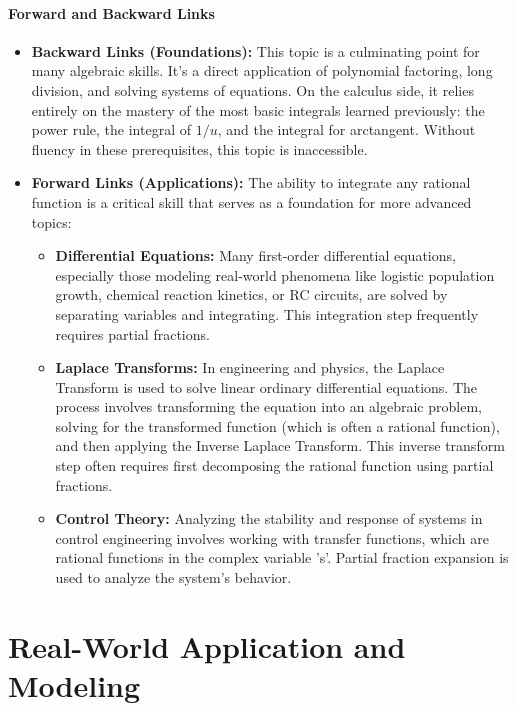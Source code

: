 \documentclass{article}
\begin{document}
\subsection{Forward and Backward Links}
\begin{itemize}
    \item \textbf{Backward Links (Foundations):} This topic is a culminating point for many algebraic skills. It's a direct application of polynomial factoring, long division, and solving systems of equations. On the calculus side, it relies entirely on the mastery of the most basic integrals learned previously: the power rule, the integral of $1/u$, and the integral for arctangent. Without fluency in these prerequisites, this topic is inaccessible.

    \item \textbf{Forward Links (Applications):} The ability to integrate any rational function is a critical skill that serves as a foundation for more advanced topics:
    \begin{itemize}
        \item \textbf{Differential Equations:} Many first-order differential equations, especially those modeling real-world phenomena like logistic population growth, chemical reaction kinetics, or RC circuits, are solved by separating variables and integrating. This integration step frequently requires partial fractions.
        \item \textbf{Laplace Transforms:} In engineering and physics, the Laplace Transform is used to solve linear ordinary differential equations. The process involves transforming the equation into an algebraic problem, solving for the transformed function (which is often a rational function), and then applying the Inverse Laplace Transform. This inverse transform step often requires first decomposing the rational function using partial fractions.
        \item \textbf{Control Theory:} Analyzing the stability and response of systems in control engineering involves working with transfer functions, which are rational functions in the complex variable 's'. Partial fraction expansion is used to analyze the system's behavior.
    \end{itemize}
\end{itemize}

\part{Real-World Application and Modeling}
\end{document}
